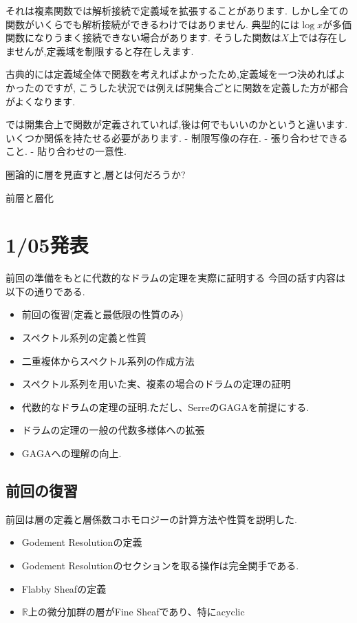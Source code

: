 それは複素関数では解析接続で定義域を拡張することがあります.
しかし全ての関数がいくらでも解析接続ができるわけではありません.
典型的には$\log x$が多価関数になりうまく接続できない場合があります.
そうした関数は$X$上では存在しませんが,定義域を制限すると存在しえます.

古典的には定義域全体で関数を考えればよかったため,定義域を一つ決めればよかったのですが,
こうした状況では例えば開集合ごとに関数を定義した方が都合がよくなります.

では開集合上で関数が定義されていれば,後は何でもいいのかというと違います.いくつか関係を持たせる必要があります.
- 制限写像の存在.
- 張り合わせできること.
- 貼り合わせの一意性.

圏論的に層を見直すと,層とは何だろうか?

前層と層化


\chapter{1/05発表}
前回の準備をもとに代数的なドラムの定理を実際に証明する
今回の話す内容は以下の通りである.
\begin{itemize}
    \item 前回の復習(定義と最低限の性質のみ)
    \item スペクトル系列の定義と性質
    \item 二重複体からスペクトル系列の作成方法
    \item スペクトル系列を用いた実、複素の場合のドラムの定理の証明
    \item 代数的なドラムの定理の証明.ただし、SerreのGAGAを前提にする.
    \item ドラムの定理の一般の代数多様体への拡張
    \item GAGAへの理解の向上.
\end{itemize}

\section{前回の復習}
前回は層の定義と層係数コホモロジーの計算方法や性質を説明した.
\begin{itemize}
  \item Godement Resolutionの定義
  \item Godement Resolutionのセクションを取る操作は完全関手である.
  \item Flabby Sheafの定義
  \item $\mathbb{R}$上の微分加群の層がFine Sheafであり、特にacyclic
\end{itemize}


